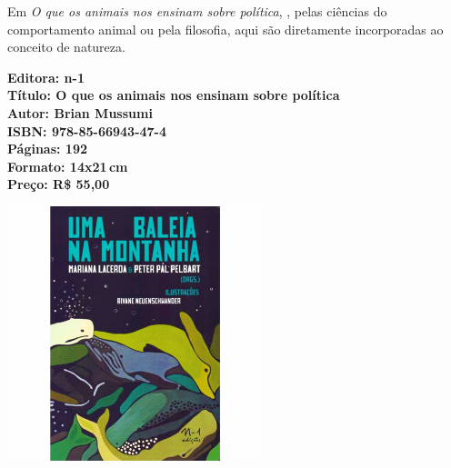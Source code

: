 \hspace*{-7cm}\hrulefill\hspace*{-7cm}

\medskip

\noindent{} Em \textit{O que os animais nos ensinam sobre política}, , pelas ciências do comportamento animal ou pela filosofia, aqui são diretamente incorporadas ao conceito de natureza.

\vfill

\hspace*{-.4cm}\begin{minipage}[c]{.5\linewidth}
\small\textbf{
\hspace*{-.1cm}Editora: n-1\\
Título: O que os animais nos ensinam sobre política\\
Autor: Brian Mussumi\\
ISBN: 978-85-66943-47-4\\
Páginas: 192\\
Formato: 14x21\,cm\\
Preço: R\$ 55,00\\
}
\end{minipage}

\pagebreak

\begin{center}
\hspace*{-3.6cm}
\hspace*{3.1cm}\includegraphics[width=74mm]{./CAPAS/baleia.jpg}
\end{center}

\hspace*{-7cm}\hrulefill\hspace*{-7cm}

